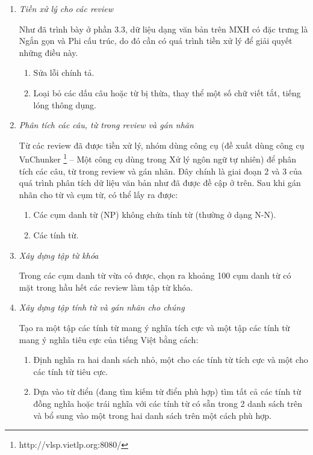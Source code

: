 \documentclass[12pt]{extarticle}
\begin{document}
			 	\begin{enumerate}
					\item \textit{Tiền xử lý cho các review}
						\par Như đã trình bày ở phần 3.3, dữ liệu dạng văn bản trên MXH có đặc trưng là Ngắn gọn và Phi cấu trúc, do đó cần có quá trình tiền xử lý để giải quyết những điều này.
						\begin{enumerate}
							\item Sửa lỗi chính tả.
							\item 	Loại bỏ các dấu câu hoặc từ bị thừa, thay thể một số chữ viết tắt, tiếng lóng thông dụng.
						\end{enumerate}
					\item \textit{Phân tích các câu, từ trong review và gán nhãn}
						\par Từ các review đã được tiền xử lý, nhóm dùng công cụ (đề xuất dùng công cụ VnChunker \footnote[1]{http://vlsp.vietlp.org:8080/} – Một công cụ dùng trong Xử lý ngôn ngữ tự nhiên) để phân tích các câu, từ trong review và gán nhãn. Đây chính là giai đoạn 2 và 3 của quá trình phân tích dữ liệu văn bản như đã được đề cập ở trên. Sau khi gán nhãn cho từ và cụm từ, có thể lấy ra được:
						\begin{enumerate}
							\item Các cụm danh từ (NP) không chứa tính từ (thường ở dạng N-N).
							\item Các tính từ.
						\end{enumerate}
					\item \textit{Xây dựng tập từ khóa}
						\par Trong các cụm danh từ vừa có được, chọn ra khoảng 100 cụm danh từ có mặt trong hầu hết các review làm tập từ khóa.
					\item\textit{ Xây dựng tập tính từ và gán nhãn cho chúng}
						\par Tạo ra một tập các tính từ mang ý nghĩa tích cực và một tập các tính từ mang ý nghĩa tiêu cực của tiếng Việt bằng cách:
						\begin{enumerate}
							\item Định nghĩa ra hai danh sách nhỏ, một cho các tính từ tích cực và một cho các tính từ tiêu cực.
							\item Dựa vào từ điển (đang tìm kiếm từ điển phù hợp) tìm tất cả các tính từ đồng nghĩa hoặc trái nghĩa với các tính từ có sẵn trong 2 danh sách trên và bổ sung vào một trong hai danh sách trên một cách phù hợp.
						\end{enumerate}

\end{enumerate}
\end{document}
